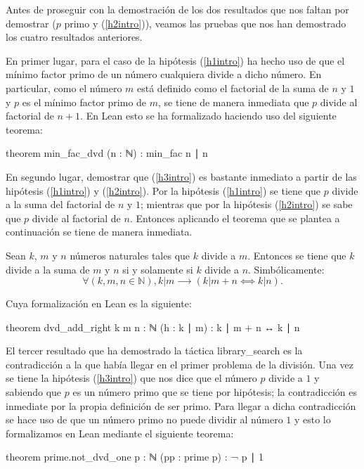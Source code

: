Antes de proseguir con la demostración de los dos resultados que nos faltan
por demostrar (\(p\) primo y (\ref{h2intro})), veamos las pruebas que nos han
demostrado los cuatro resultados anteriores.

En primer lugar, para el caso de la hipótesis (\ref{h1intro}) ha hecho uso
de que el mínimo factor primo de un número cualquiera divide a dicho número.
En particular, como el número \(m\) está definido como el factorial de la suma
de \(n\) y \(1\) y \(p\) es el mínimo factor primo de \(m\), se tiene de manera
inmediata que \(p\) divide al factorial de \(n+1\). En Lean esto se ha
formalizado haciendo uso del siguiente teorema:
\begin{leancode}
theorem min_fac_dvd (n : ℕ) : min_fac n ∣ n
\end{leancode}


En segundo lugar, demostrar que (\ref{h3intro}) es bastante inmediato a partir
de las hipótesis (\ref{h1intro}) y (\ref{h2intro}). Por la hipótesis
(\ref{h1intro}) se tiene que \(p\) divide a la suma del factorial de \(n\) y
\(1\); mientras que por la hipótesis (\ref{h2intro}) se sabe que \(p\) divide
al factorial de \(n\). Entonces aplicando el teorema que se plantea a
continuación se tiene de manera inmediata.
\begin{teorema}
  Sean \(k\), \(m\) y \(n\) números naturales tales que \(k\) divide a
  \(m\). Entonces se tiene que \(k\) divide a la suma de \(m\) y \(n\)
  si y solamente si \(k\) divide a \(n\).  Simbólicamente:
  \begin{equation*}
    ∀(k,m,n∈ℕ), k|m ⟶ (k|m+n⟺k|n).
  \end{equation*}
\end{teorema}

Cuya formalización en Lean es la siguiente:
\begin{leancode}
theorem dvd_add_right {k m n : ℕ} (h : k ∣ m) : k ∣ m + n ↔ k ∣ n
\end{leancode}

El tercer resultado que ha demostrado la táctica
 {library\_search} es la contradicción a la que
había llegar en el primer problema de la división. Una vez se tiene la
hipótesis (\ref{h3intro}) que nos dice que el número \(p\) divide a
\(1\) y sabiendo que \(p\) es un número primo que se tiene por
hipótesis; la contradicción es inmediate por la propia definición de ser
primo. Para llegar a dicha contradicción se hace uso de que un número
primo no puede dividir al número \(1\) y esto lo formalizamos en Lean
mediante el siguiente teorema:
\begin{leancode}
theorem prime.not_dvd_one {p : ℕ} (pp : prime p) : ¬ p ∣ 1
\end{leancode}

